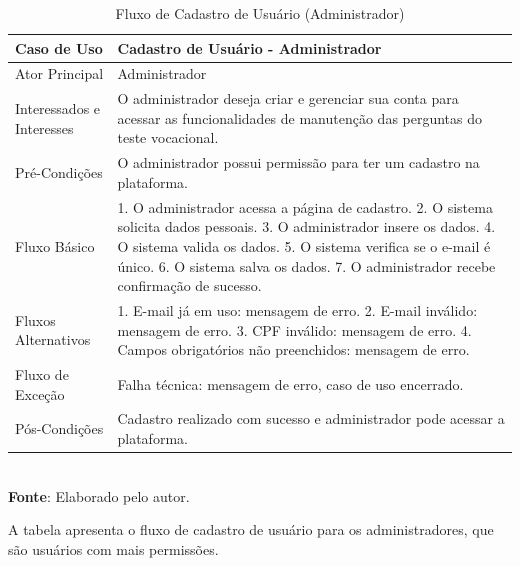 \begin{table}[h!]
\centering
\caption{Fluxo de Cadastro de Usuário (Administrador)}
\begin{tabular}{|m{4cm}|m{11cm}|}
\hline
\textbf{Caso de Uso}   & \textbf{Cadastro de Usuário - Administrador} \\
\hline
Ator Principal & Administrador\\
\hline
Interessados e Interesses & O administrador deseja criar e gerenciar sua conta para acessar as funcionalidades de manutenção das perguntas do teste vocacional. \\
\hline
Pré-Condições & O administrador possui permissão para ter um cadastro na plataforma. \\
\hline
Fluxo Básico & 

1. O administrador acessa a página de cadastro.
2. O sistema solicita dados pessoais.
3. O administrador insere os dados.
4. O sistema valida os dados.
5. O sistema verifica se o e-mail é único.
6. O sistema salva os dados.
7. O administrador recebe confirmação de sucesso.\\
\hline
Fluxos Alternativos & 

1. E-mail já em uso: mensagem de erro.
2. E-mail inválido: mensagem de erro.
3. CPF inválido: mensagem de erro.
4. Campos obrigatórios não preenchidos: mensagem de erro.
\\
\hline
Fluxo de Exceção & Falha técnica: mensagem de erro, caso de uso encerrado. \\
\hline
Pós-Condições & Cadastro realizado com sucesso e administrador pode acessar a plataforma. \\
\hline
\end{tabular}
\label{table:casos-de-uso}
\\[1ex]
\footnotesize \textbf{Fonte}: Elaborado pelo autor.
\end{table}

A tabela apresenta o fluxo de cadastro de usuário para os administradores, que são usuários com mais permissões.


